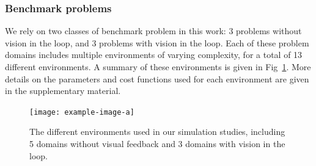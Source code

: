 \subsubsection{Benchmark problems}

We rely on two classes of benchmark problem in this work: 3 problems without vision in the loop, and 3 problems with vision in the loop. Each of these problem domains includes multiple environments of varying complexity, for a total of 13 different environments. A summary of these environments is given in Fig~\ref{ch:corl:fig:environments}. More details on the parameters and cost functions used for each environment are given in the supplementary material.

\begin{figure}[t]
    \centering
    \texttt{[image: example-image-a]}  %
    \caption{The different environments used in our simulation studies, including 5 domains without visual feedback and 3 domains with vision in the loop.}\label{ch:corl:fig:environments}
\end{figure}

